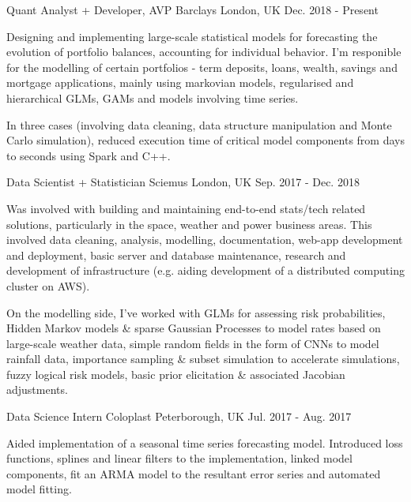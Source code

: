 

\begin{cventries}

  \cventry
    {Quant Analyst + Developer, AVP} %
    {Barclays} %
    {London, UK} %
    {Dec. 2018 - Present} %
    {
      \begin{cvitems} %
        \item {Designing and implementing large-scale statistical models for forecasting the evolution of portfolio balances, accounting for individual behavior. I'm responible for the modelling of certain portfolios - term deposits, loans, wealth, savings and mortgage applications, mainly using markovian models, regularised and hierarchical GLMs, GAMs and models involving time series.}
        \item {In three cases (involving data cleaning, data structure manipulation and Monte Carlo simulation), reduced execution time of critical model components from days to seconds using Spark and C++.}
      \end{cvitems}
    }

  \cventry
    {Data Scientist + Statistician} %
    {Sciemus} %
    {London, UK} %
    {Sep. 2017 - Dec. 2018} %
    {
      \begin{cvitems} %
        \item {Was involved with building and maintaining end-to-end stats/tech related solutions, particularly in the space, weather and power business areas. This involved data cleaning, analysis, modelling, documentation, web-app development and deployment, basic server and database maintenance, research and development of infrastructure (e.g. aiding development of a distributed computing cluster on AWS).}
        \item {On the modelling side, I’ve worked with GLMs for assessing risk probabilities, Hidden Markov models \& sparse Gaussian Processes to model rates based on large-scale weather data, simple random fields in the form of CNNs to model rainfall data, importance sampling \& subset simulation to accelerate simulations, fuzzy logical risk models, basic prior elicitation \& associated Jacobian adjustments.}
      \end{cvitems}
    }

  \cventry
    {Data Science Intern} %
    {Coloplast} %
    {Peterborough, UK} %
    {Jul. 2017 - Aug. 2017} %
    {
      \begin{cvitems} %
        \item {Aided implementation of a seasonal time series forecasting model. Introduced loss functions, splines and linear filters to the implementation, linked model components, fit an ARMA model to the resultant error series and automated model fitting.}
      \end{cvitems}
    }


\end{cventries}
